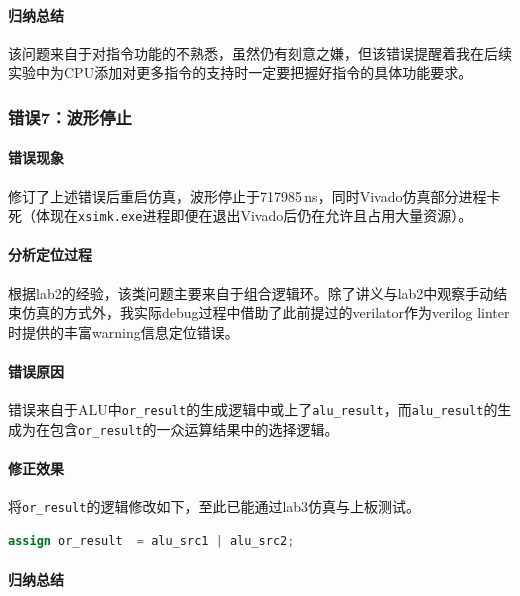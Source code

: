 \documentclass[UTF-8,twoside,c5size]{ctexart}
\begin{document}
	\paragraph{归纳总结}\hfill
	
	该问题来自于对指令功能的不熟悉，虽然仍有刻意之嫌，但该错误提醒着我在后续实验中为CPU添加对更多指令的支持时一定要把握好指令的具体功能要求。
	
	\subsubsection{错误\textbf{7：}波形停止}
	
	\paragraph{错误现象}\hfill
	
	修订了上述错误后重启仿真，波形停止于717985\,ns，同时Vivado仿真部分进程卡死（体现在\texttt{xsimk.exe}进程即便在退出Vivado后仍在允许且占用大量资源）。
	
	\paragraph{分析定位过程}\hfill
	
	根据lab2的经验，该类问题主要来自于组合逻辑环。除了讲义与lab2中观察手动结束仿真的方式外，我实际debug过程中借助了此前提过的verilator作为verilog linter时提供的丰富warning信息定位错误。
	
	\paragraph{错误原因}\hfill
	
	错误来自于ALU中\texttt{or\_result}的生成逻辑中或上了\texttt{alu\_result}，而\texttt{alu\_result}的生成为在包含\texttt{or\_result}的一众运算结果中的选择逻辑。
	
	\paragraph{修正效果}\hfill
	
	将\texttt{or\_result}的逻辑修改如下，至此已能通过lab3仿真与上板测试。
	
	\begin{lstlisting}[language=verilog]
	assign or_result  = alu_src1 | alu_src2;
	\end{lstlisting}

	\paragraph{归纳总结}\hfill
	
\end{document}
